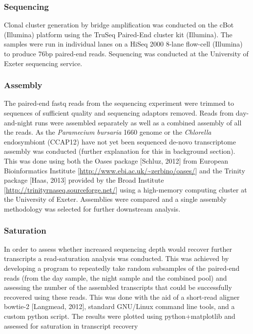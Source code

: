\subsubsection{Sequencing}

Clonal cluster generation by bridge amplification was conducted on the cBot (Illumina) platform using the TruSeq Paired-End cluster kit (Illumina).  
The samples were run in individual lanes on a HiSeq 2000 8-lane flow-cell (Illumina) to produce 76bp paired-end reads. 
Sequencing was conducted at the University of Exeter sequencing service.

\subsubsection{Assembly}
The paired-end fastq reads from the sequencing experiment were trimmed to sequences of sufficient quality and sequencing adaptors removed. 
Reads from day-and-night runs were assembled separately as well as a combined assembly of all the reads. 
As the \textit{Paramecium bursaria} 1660 genome or the \textit{Chlorella} endosymbiont (CCAP12) have not yet been sequenced de-novo transcriptome assembly was conducted (further explanation for this in background section).  
This was done using both the Oases package [Schluz, 2012] from European Bioinformatics Institute [\url{http://www.ebi.ac.uk/~zerbino/oases/}] and the Trinity package [Haas, 2013] provided by the Broad Institute [\url{http://trinityrnaseq.sourceforge.net/}] using a high-memory computing cluster at the University of Exeter.  
Assemblies were compared and a single assembly methodology was selected for further downstream analysis. 

\subsubsection{Saturation}
In order to assess whether increased sequencing depth would recover further transcripts a read-saturation analysis was conducted.  
This was achieved by developing a program to repeatedly take random subsamples of the paired-end reads (from the day sample, the night sample and the combined pool) and assessing the number of the assembled transcripts that could be successfully recovered using these reads.  
This was done with the aid of a short-read aligner bowtie-2 [Langmead, 2012], standard GNU/Linux command line tools, and a custom python script.  
The results were plotted using python+matplotlib and assessed for saturation in transcript recovery

